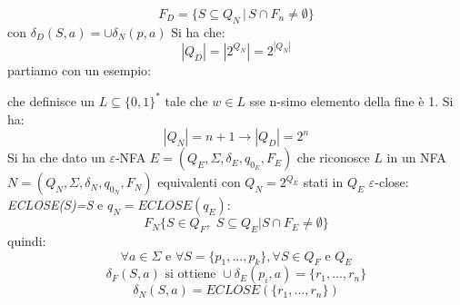 \documentclass[a4paper,12pt, oneside]{book}
\begin{document}
$$F_D=\{S\subseteq Q_N\,|\, S\cap F_n\neq \emptyset\}$$
con $\delta_D(S,a)=\cup \delta_N(p,a)$
 Si ha che:
$$|Q_D|=|2^{Q_N}|=2^{|Q_N|}$$
partiamo con un esempio:
\begin{center}
\end{center}
che definisce un $L\subseteq\{0,1\}^*$ tale che $w\in L$ sse n-simo elemento della fine è 1. Si ha:
$$|Q_N|=n+1\to |Q_D|=2^n$$
Si ha che dato un $\varepsilon$-NFA $E=(Q_E, \Sigma, \delta_E, q_{0_E}, F_E)$ che riconosce $L$ in un NFA $N=(Q_N, \Sigma, \delta_N, q_{0_N}, F_N)$ equivalenti con $Q_N=2^{Q_E}$ stati in $Q_E$ $\varepsilon$-close: \textit{ECLOSE(S)=S} e $q_N=ECLOSE(q_E)$:
$$F_N\{S\in Q_F,\,\, S\subseteq Q_E | S\cap F_E\neq \emptyset\}$$
quindi:
$$\forall a\in \Sigma \mbox{ e } \forall S=\{p_1,...,p_k\}, \forall S\in Q_F \mbox{ e } Q_E$$
$$\delta_F(S,a) \mbox{ si ottiene }\cup \delta_E(p_i,a)=\{r_1,..., r_n\}$$
$$\delta_N(S,a)=ECLOSE(\{r_1, ..., r_n\})$$
\newpage
\end{document}
